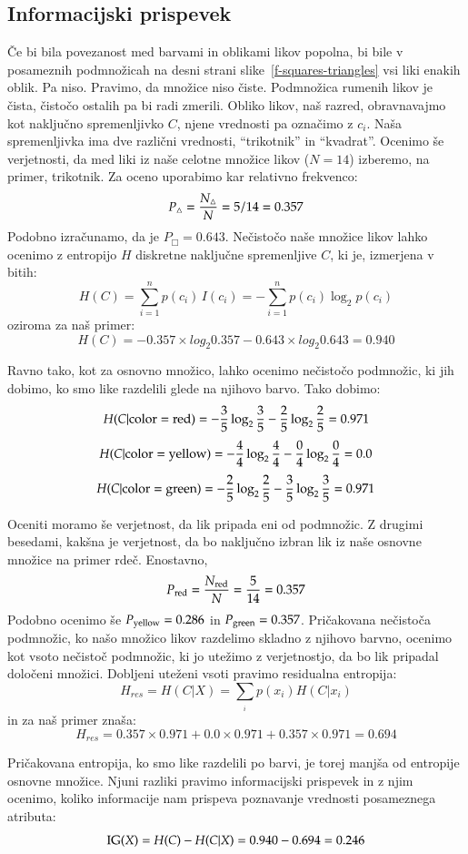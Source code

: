 \subsection{Informacijski prispevek}

Če bi bila povezanost med barvami in oblikami likov popolna, bi bile v posameznih podmnožicah na desni strani slike~\ref{f-squares-triangles} vsi liki enakih oblik. Pa niso. Pravimo, da množice niso čiste. Podmnožica rumenih likov je čista, čistočo ostalih pa bi radi zmerili. Obliko likov, naš razred, obravnavajmo kot naključno spremenljivko $C$, njene vrednosti pa označimo z $c_i$. Naša spremenljivka ima dve različni vrednosti, ``trikotnik'' in ``kvadrat''. Ocenimo še verjetnosti, da med liki iz naše celotne množice likov ($N=14$) izberemo, na primer, trikotnik. Za oceno uporabimo kar relativno frekvenco:
%
$$ P_{\triangle}={N_{\triangle} \over N} = 5/14 = 0.357 $$
%
Podobno izračunamo, da je $P_{\Box}= 0.643$. Nečistočo naše množice likov lahko ocenimo z entropijo $H$ diskretne naključne spremenljive $C$, ki je, izmerjena v bitih:
%
$$ H(C) = \sum_{i=1}^n {p(c_i)\,I(c_i)} = -\sum_{i=1}^n {p(c_i) \log_2 p(c_i)} $$
%
oziroma za naš primer:
$$ H(C) = - 0.357 \times log_2 0.357 - 0.643 \times log_2 0.643 = 0.940 $$

Ravno tako, kot za osnovno množico, lahko ocenimo nečistočo podmnožic, ki jih dobimo, ko smo like razdelili glede na njihovo barvo. Tako dobimo:
%
$$ H(C|{\rm color=red}) = -{3\over 5}\log_2{3\over 5}-{2\over 5}\log_2{2\over 5}=0.971 $$
$$ H(C|{\rm color=yellow}) = -{4\over 4}\log_2{4\over 4}-{0\over 4}\log_2{0\over 4}=0.0 $$
$$ H(C|{\rm color=green}) = -{2\over 5}\log_2{2\over 5}-{3\over 5}\log_2{3\over 5}=0.971 $$

Oceniti moramo še verjetnost, da lik pripada eni od podmnožic. Z drugimi besedami, kakšna je verjetnost, da bo naključno izbran lik iz naše osnovne množice na primer rdeč. Enostavno, 
%
$$ P_{\rm red}={N_{\rm red}\over N} = {5\over 14}=0.357$$
%
Podobno ocenimo še $P_{\rm yellow}=0.286$ in $P_{\rm green}=0.357$. Pričakovana nečistoča podmnožic, ko našo množico likov razdelimo skladno z njihovo barvno, ocenimo kot vsoto nečistoč podmnožic, ki jo utežimo z verjetnostjo, da bo lik pripadal določeni množici. Dobljeni uteženi vsoti pravimo residualna entropija:
%
$$ H_{res}=H(C|X)=\sum_{_i} p(x_i) H(C|x_i)  $$
%
in za naš primer znaša:
$$ H_{res} = 0.357 \times 0.971 + 0.0 \times 0.971 + 0.357 \times 0.971 = 0.694 $$

Pričakovana entropija, ko smo like razdelili po barvi, je torej manjša od entropije osnovne množice. Njuni razliki pravimo informacijski prispevek  in z njim ocenimo, koliko informacije nam prispeva poznavanje vrednosti posameznega atributa:
$$ {\rm IG}(X) = H(C) - H(C|X) = 0.940 - 0.694 = 0.246 $$

